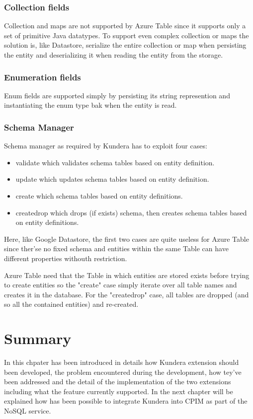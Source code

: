 \subsubsection{Collection fields}
Collection and maps are not supported by Azure Table since it supports only a set of primitive Java datatypes.
To support even complex collection or maps the solution is, like Datastore, serialize the entire collection or map when persisting the entity and deserializing it when reading the entity from the storage.

\subsubsection{Enumeration fields}
Enum fields are supported simply by persisting its string represention and instantiating the enum type bak when the entity is read.

\subsubsection{Schema Manager}
Schema manager as required by Kundera has to exploit four cases:
\begin{itemize}
\item validate which validates schema tables based on entity definition.
\item update which updates schema tables based on entity definition.
\item create which schema tables based on entity definitions.
\item create\textunderscore drop which drops (if exists) schema, then creates schema tables based on entity definitions.
\end{itemize}
Here, like Google Datastore, the first two cases are quite useless for Azure Table since ther'se no fixed schema and entities within the same Table can have different properties withouth restriction.

Azure Table need that the Table in which entities are stored exists before trying to create entities so the "create" case simply iterate over all table names and creates it in the database. 
For the "create\textunderscore drop" case, all tables are dropped (and so all the contained entities) and re-created.

\section{Summary}
In this chpater has been introduced in details how Kundera extension should been developed, the problem encountered during the development, how tey've been addressed and the detail of the implementation of the two extensions including what the feature currently supported.
In the next chapter will be explained how has been possible to integrate Kundera into CPIM as part of the NoSQL service.
